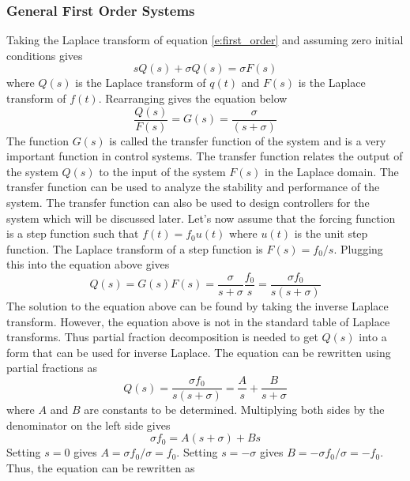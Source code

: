 \subsubsection{General First Order Systems}

Taking the Laplace transform of equation \ref{e:first_order} and assuming zero initial conditions gives 
\begin{equation}
    sQ(s) + \sigma Q(s) = \sigma F(s)
\end{equation}
where $Q(s)$ is the Laplace transform of $q(t)$ and $F(s)$ is the Laplace transform of $f(t)$. Rearranging gives the equation below
\begin{equation}
    \frac{Q(s)}{F(s)} = G(s) = \frac{\sigma}{(s+\sigma)}
\end{equation}
The function $G(s)$ is called the transfer function of the system and is a very important function in control systems. The transfer function relates the output of the system $Q(s)$ to the input of the system $F(s)$ in the Laplace domain. The transfer function can be used to analyze the stability and performance of the system. The transfer function can also be used to design controllers for the system which will be discussed later. Let's now assume that the forcing function is a step function such that $f(t)=f_0u(t)$ where $u(t)$ is the unit step function. The Laplace transform of a step function is $F(s)=f_0/s$. Plugging this into the equation above gives
\begin{equation}
    Q(s) = G(s)F(s) = \frac{\sigma}{s+\sigma}\frac{f_0}{s} = \frac{\sigma f_0}{s(s+\sigma)}
\end{equation}
The solution to the equation above can be found by taking the inverse Laplace transform. However, the equation above is not in the standard table of Laplace transforms. Thus partial fraction decomposition is needed to get $Q(s)$ into a form that can be used for inverse Laplace. The equation can be rewritten using partial fractions as
\begin{equation}
    Q(s) = \frac{\sigma f_0}{s(s+\sigma)} = \frac{A}{s} + \frac{B}{s+\sigma}
\end{equation}
where $A$ and $B$ are constants to be determined. Multiplying both sides by the denominator on the left side gives
\begin{equation}
    \sigma f_0 = A(s+\sigma) + Bs
\end{equation}
Setting $s=0$ gives $A=\sigma f_0/\sigma = f_0$. Setting $s=-\sigma$ gives $B=-\sigma f_0/\sigma = -f_0$. Thus, the equation can be rewritten as
